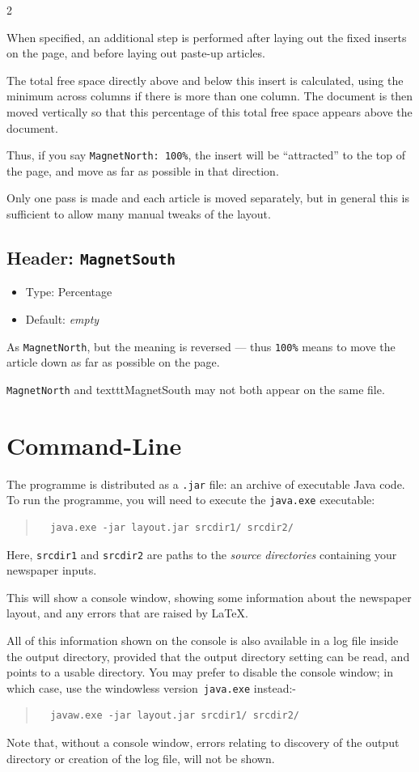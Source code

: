 \documentclass[a4paper,DIV=11]{scrartcl}
\newcommand{\property}[5]{
  \subsection{#1: \texttt{#2}}
  \begin{itemize}
  \item Type: #3
  \item Default: #4
  \end{itemize}
  #5
}
\newcommand{\header}{\property{Header}}
\begin{document}
\begin{multicols}{2}
{  When specified, an additional step is performed after laying out the
  fixed inserts on the page, and before laying out paste-up articles.

  The total free space directly above and below this insert is
  calculated, using the minimum across columns if there is more than
  one column. The document is then moved vertically so that this
  percentage of this total free space appears above the document.

  Thus, if you say \texttt{MagnetNorth: 100\%}, the insert will be
  ``attracted'' to the top of the page, and move as far as possible in
  that direction.

  Only one pass is made and each article is moved separately, but in
  general this is sufficient to allow many manual tweaks of the layout.
}
\header{MagnetSouth}{Percentage}{\textit{empty}}{ As
  \texttt{MagnetNorth}, but the meaning is reversed --- thus
  \texttt{100\%} means to move the article down as far as possible on
  the page.

  \texttt{MagnetNorth} and texttt{MagnetSouth} may not both appear on the same file.
}
\end{multicols}

\section*{Command-Line}

The programme is distributed as a \verb!.jar! file: an archive of
executable Java code. To run the programme, you will need to execute
the \verb!java.exe! executable:

\begin{quote}
\begin{verbatim}
  java.exe -jar layout.jar srcdir1/ srcdir2/
\end{verbatim}
\end{quote}

Here, \verb!srcdir1! and \verb!srcdir2! are paths to the
\textit{source directories} containing your newspaper inputs.

This will show a console window, showing some information about the
newspaper layout, and any errors that are raised by \LaTeX.

All of this information shown on the console is also available in a
log file inside the output directory, provided that the output
directory setting can be read, and points to a usable directory. You
may prefer to disable the console window; in which case, use the
windowless version~\texttt{java.exe} instead:-

\begin{quote}
\begin{verbatim}
  javaw.exe -jar layout.jar srcdir1/ srcdir2/
\end{verbatim}
\end{quote}

Note that, without a console window, errors relating to discovery of
the output directory or creation of the log file, will not be shown.
\end{document}
